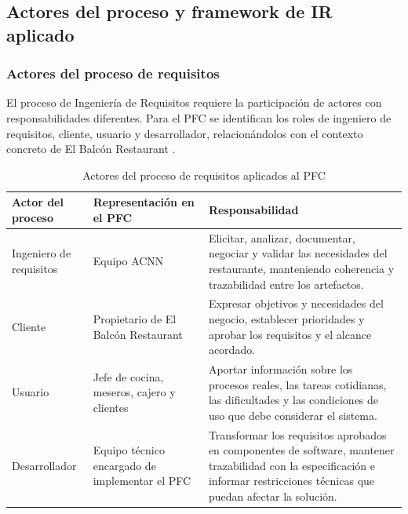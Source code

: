 \subsection{Actores del proceso y framework de IR aplicado}
\subsubsection{Actores del proceso de requisitos}

El proceso de Ingeniería de Requisitos requiere la participación de actores
con responsabilidades diferentes. Para el PFC se identifican los roles de
ingeniero de requisitos, cliente, usuario y desarrollador, relacionándolos
con el contexto concreto de El Balcón Restaurant
\cite{ieee29148,pohl2025}.

\begin{table}[H]
\centering
\footnotesize
\caption{Actores del proceso de requisitos aplicados al PFC}
\label{tab:actores-ir}
\begin{tabularx}{\textwidth}{@{}p{}p{}Y@{}}
\toprule
\textbf{Actor del proceso} &
\textbf{Representación en el PFC} &
\textbf{Responsabilidad} \\
\midrule

Ingeniero de requisitos &
Equipo ACNN &
Elicitar, analizar, documentar, negociar y validar las necesidades del
restaurante, manteniendo coherencia y trazabilidad entre los artefactos. \\

Cliente &
Propietario de El Balcón Restaurant &
Expresar objetivos y necesidades del negocio, establecer prioridades y
aprobar los requisitos y el alcance acordado. \\

Usuario &
Jefe de cocina, meseros, cajero y clientes &
Aportar información sobre los procesos reales, las tareas cotidianas, las
dificultades y las condiciones de uso que debe considerar el sistema. \\

Desarrollador &
Equipo técnico encargado de implementar el PFC &
Transformar los requisitos aprobados en componentes de software, mantener
trazabilidad con la especificación e informar restricciones técnicas que
puedan afectar la solución. \\

\bottomrule
\end{tabularx}
\end{table}

